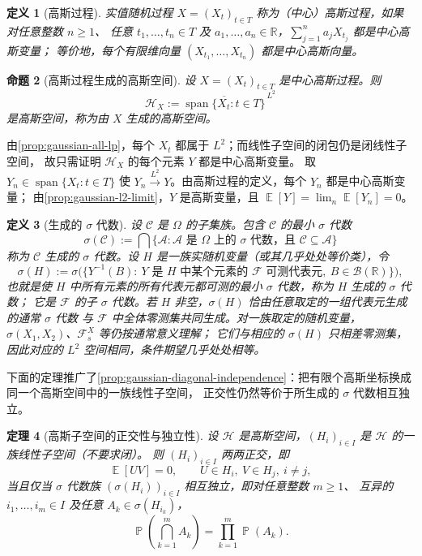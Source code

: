 \documentclass[UTF8,11pt,a4paper,oneside,fontset=fandol]{ctexrep}
\makeatletter
\numberwithin{equation}{section}
\theoremstyle{zhthm}
\newtheorem{theorem}{定理}[section]
\newtheorem{proposition}[theorem]{命题}
\newtheorem{definition}[theorem]{定义}
\renewenvironment{proof}[1][\proofname]{\par
  \pushQED{\qed}%
  \normalfont\topsep6\p@\@plus6\p@\relax
  \trivlist
  \item[\hskip\labelsep\bfseries#1\hspace{0.5em}]\ignorespaces
}{%
  \popQED\endtrivlist\@endpefalse
}
\renewcommand{\proofname}{证明}
\newcommand{\R}{\mathbb{R}}
\newcommand{\A}{\mathcal{A}}
\newcommand{\B}{\mathcal{B}}
\newcommand{\F}{\mathcal{F}}
\newcommand{\Hcal}{\mathcal{H}}
\DeclareMathOperator{\Prob}{\mathbb{P}}
\DeclareMathOperator{\E}{\mathbb{E}}
\DeclareMathOperator{\Span}{span}
\newcommand{\Lpto}[1]{\xrightarrow{L^{#1}}}
\makeatother
\begin{document}
\begin{definition}[高斯过程]
\label{def:gaussian-process}
实值随机过程 $X=(X_t)_{t\in T}$ 称为（中心）高斯过程，如果对任意整数 $n\ge1$、
任意 $t_1,\ldots,t_n\in T$ 及 $a_1,\ldots,a_n\in\R$，$\sum_{j=1}^{n}a_jX_{t_j}$ 都是中心高斯变量；
等价地，每个有限维向量 $(X_{t_1},\ldots,X_{t_n})$ 都是中心高斯向量。
\end{definition}

\begin{proposition}[高斯过程生成的高斯空间]
\label{prop:gaussian-process-generated-space}
设 $X=(X_t)_{t\in T}$ 是中心高斯过程。则
\[
  \Hcal_X:=\overline{\Span\{X_t:t\in T\}}^{\,L^2}
\]
是高斯空间，称为由 $X$ 生成的高斯空间。
\end{proposition}

\begin{proof}
由\cref{prop:gaussian-all-lp}，每个 $X_t$ 都属于 $L^2$；而线性子空间的闭包仍是闭线性子空间，
故只需证明 $\Hcal_X$ 的每个元素 $Y$ 都是中心高斯变量。
取 $Y_n\in\Span\{X_t:t\in T\}$ 使 $Y_n\Lpto{2}Y$。由高斯过程的定义，每个 $Y_n$ 都是中心高斯变量；
由\cref{prop:gaussian-l2-limit}，$Y$ 是高斯变量，且 $\E[Y]=\lim_n\E[Y_n]=0$。
\end{proof}

\begin{definition}[生成的 $\sigma$ 代数]
\label{def:sigma-algebra-generated-by-sets}
设 $\mathcal C$ 是 $\Omega$ 的子集族。包含 $\mathcal C$ 的最小 $\sigma$ 代数
\[
  \sigma(\mathcal C):=\bigcap\bigl\{\A:\A\text{ 是 $\Omega$ 上的 $\sigma$ 代数，且 }\mathcal C\subseteq\A\bigr\}
\]
称为 $\mathcal C$ 生成的 $\sigma$ 代数。设 $H$ 是一族实随机变量（或其几乎处处等价类），令
\[
  \sigma(H):=\sigma\bigl(\bigl\{Y^{-1}(B):\ Y\text{ 是 $H$ 中某个元素的 $\F$ 可测代表元},\ B\in\B(\R)\bigr\}\bigr),
\]
也就是使 $H$ 中所有元素的所有代表元都可测的最小 $\sigma$ 代数，称为 $H$ 生成的 $\sigma$ 代数；
它是 $\F$ 的子 $\sigma$ 代数。若 $H$ 非空，$\sigma(H)$ 恰由任意取定的一组代表元生成的通常 $\sigma$ 代数
与 $\F$ 中全体零测集共同生成。对一族取定的随机变量，$\sigma(X_1,X_2)$、$\F_s^X$ 等仍按通常意义理解；
它们与相应的 $\sigma(H)$ 只相差零测集，因此对应的 $L^2$ 空间相同，条件期望几乎处处相等。
\end{definition}

下面的定理推广了\cref{prop:gaussian-diagonal-independence}：把有限个高斯坐标换成同一个高斯空间中的一族线性子空间，
正交性仍然等价于所生成的 $\sigma$ 代数相互独立。

\begin{theorem}[高斯子空间的正交性与独立性]
\label{thm:gaussian-subspaces-orthogonality-independence}
设 $\Hcal$ 是高斯空间，$(H_i)_{i\in I}$ 是 $\Hcal$ 的一族线性子空间（不要求闭）。
则 $(H_i)_{i\in I}$ 两两正交，即
\[
  \E[UV]=0,\qquad U\in H_i,\ V\in H_j,\ i\ne j,
\]
当且仅当 $\sigma$ 代数族 $(\sigma(H_i))_{i\in I}$ 相互独立，即对任意整数 $m\ge1$、
互异的 $i_1,\ldots,i_m\in I$ 及任意 $A_k\in\sigma(H_{i_k})$，
\begin{equation}
  \label{eq:gaussian-subspace-sigma-independence}
  \Prob\!\left(\bigcap_{k=1}^{m}A_k\right)=\prod_{k=1}^{m}\Prob(A_k).
\end{equation}
\end{theorem}
\end{document}
